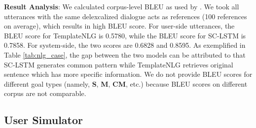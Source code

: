 \noindent\textbf{Result Analysis}:
We calculated corpus-level BLEU as used by \citet{wen2015sclstm}. We took all utterances with the same delexcalized dialogue acts as references (100 references on average), which results in high BLEU score.
For user-side utterances, the BLEU score for TemplateNLG is 0.5780, while the BLEU score for SC-LSTM is 0.7858. For system-side, the two scores are 0.6828 and 0.8595.
As exemplified in Table \ref{tab:nlg_case}, the gap between the two models can be attributed to that SC-LSTM generates common pattern while TemplateNLG retrieves 
original sentence which has more specific information.
We do not provide BLEU scores for different goal types (namely, \textbf{S}, \textbf{M}, \textbf{CM}, etc.) because BLEU scores on different corpus are not comparable.
 

\begin{table}[]
\begin{CJK*}{UTF8}{gbsn}
    \small
    \centering
    \caption{
    Comparison of SC-LSTM and TemplateNLG. The input is delexicalized dialogue acts, where the actual values are replaced with \$name and \$cost. Two retrieved results are shown for TemplateNLG.
    }
    \label{tab:nlg_case}
\end{CJK*}
\end{table}

\subsection{User Simulator}

